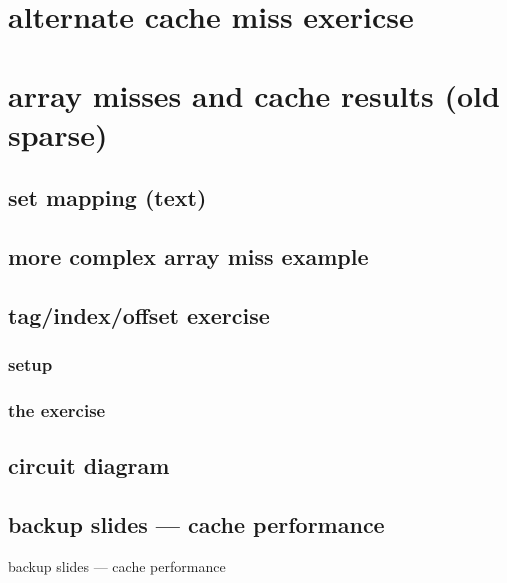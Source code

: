 \section{alternate cache miss exericse}


\section{array misses and cache results (old sparse)}


\subsection{set mapping (text)}


%

\subsection{more complex array miss example}


\subsection{tag/index/offset exercise}
\subsubsection{setup}

\subsubsection{the exercise}


\subsection{circuit diagram}



\subsection{backup slides --- cache performance}
\begin{frame}{backup slides --- cache performance}
\end{frame}

